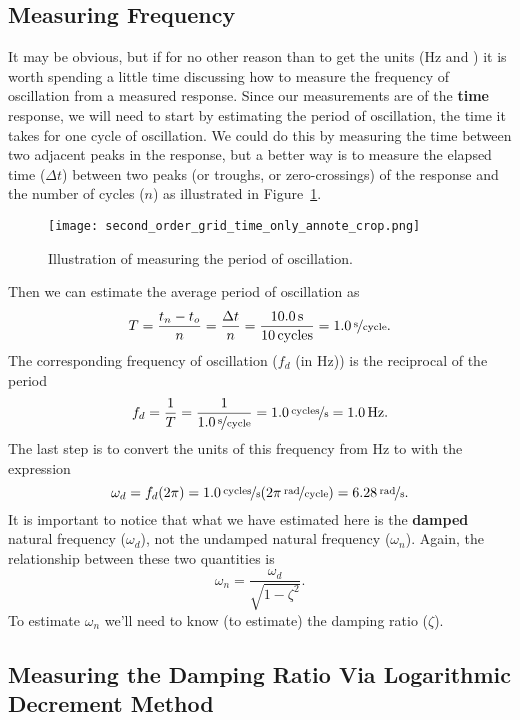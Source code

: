 \subsection{Measuring Frequency}
It may be obvious, but if for no other reason than to get the units (\unit[]{Hz} and ) it is worth spending a little time discussing how to measure the frequency of oscillation from a measured response.  Since our measurements are of the {\bf time} response, we will need to start by estimating the period of oscillation, the time it takes for one cycle of oscillation.  We could do this by measuring the time between two adjacent peaks in the response, but a better way is to measure the elapsed time ($\Delta t$) between two peaks (or troughs, or zero-crossings) of the response and the number of cycles ($n$) as illustrated in Figure~\ref{f:secondtime}.
\begin{figure}[h!bt]
\centerline{
{\texttt{[image: second\_order\_grid\_time\_only\_annote\_crop.png]}}}
\caption{Illustration of measuring the period of oscillation.}
\label{f:secondtime}
\end{figure}
Then we can estimate the average period of oscillation as
\begin{equation}
T = \frac{t_n-t_o}{n}=\frac{\Delta t}{n}=\frac{\unit[10.0]{s}}{\unit[10]{cycles}} = \unitfrac[1.0]{s}{cycle}.
\end{equation}
The corresponding frequency of oscillation ($f_d$ (in Hz)) is the reciprocal of the period
\begin{equation}
f_d = \frac{1}{T} = \frac{1}{\unitfrac[1.0]{s}{cycle}} = \unitfrac[1.0]{cycles}{s} = \unit[1.0]{Hz}.
\end{equation}
The last step is to convert the units of this frequency from Hz to  with the expression
\begin{equation}
\omega_d = f_d (2 \pi) = \unitfrac[1.0]{cycles}{s} (\unitfrac[2 \pi]{rad}{cycle}) = \unitfrac[6.28]{rad}{s}.
\end{equation}
It is important to notice that what we have estimated here is the {\bf damped} natural frequency ($\omega_d$), not the undamped natural frequency ($\omega_n$).  Again, the relationship between these two quantities is
\begin{equation}
\omega_n = \frac{\omega_d}{\sqrt{1-\zeta^2}}.
\end{equation}
To estimate $\omega_n$ we'll need to know (to estimate) the damping ratio ($\zeta$).

\subsection{Measuring the Damping Ratio Via Logarithmic Decrement Method}

